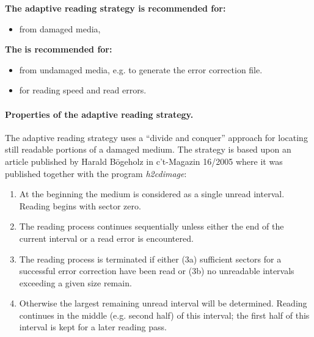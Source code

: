 \medskip

{\bf The adaptive reading strategy is recommended for:}

\begin{itemize}
\item {} from damaged media,
\end{itemize}

\medskip

{\bf The}  {\bf is recommended for:}

\begin{itemize}
\item {} from undamaged media,
  e.g. to generate the error correction file.
\item {} for reading speed and read errors.
\end{itemize}

\paragraph{Properties of the adaptive reading strategy.}\quad
\medskip

The adaptive reading strategy uses a ``divide and conquer'' approach for locating still readable portions of a damaged medium. The strategy is based upon an article published by Harald Bögeholz in c't-Magazin 16/2005 where it was published together with the program {\em h2cdimage}:

\begin{enumerate}
\item At the beginning the medium is considered as a single unread interval.
  Reading begins with sector zero.
\item The reading process continues sequentially unless either the end of the
  current interval or a read error is encountered.
\item The reading process is terminated if either (3a) sufficient sectors for
  a successful error correction have been read or (3b) no unreadable intervals
  exceeding a given size remain.
\item Otherwise the largest remaining unread interval will be determined. Reading
  continues in the middle (e.g. second half) of this interval; the first half of
  this interval is kept for a later reading pass.
\end{enumerate}

